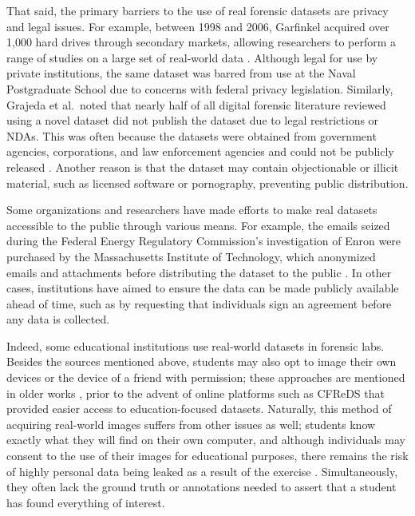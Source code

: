\documentclass[letterpaper,12pt]{report}
\begin{document}
That said, the primary barriers to the use of real forensic datasets are
privacy and legal issues. For example, between 1998 and 2006, Garfinkel
acquired over 1,000 hard drives through secondary markets, allowing
researchers to perform a range of studies on a large set of real-world
data \cite{garfinkelForensicCorporaChallenge2007}. Although legal
for use by private institutions, the same dataset was barred from use at
the Naval Postgraduate School due to concerns with federal privacy
legislation. Similarly, Grajeda et al.~noted that nearly half of all
digital forensic literature reviewed using a novel dataset did not
publish the dataset due to legal restrictions or NDAs. This was often
because the datasets were obtained from government agencies,
corporations, and law enforcement agencies and could not be publicly
released \cite{grajedaAvailabilityDatasetsDigital2017}. Another
reason is that the dataset may contain objectionable or illicit
material, such as licensed software or pornography, preventing public
distribution.

Some organizations and researchers have made efforts to make real
datasets accessible to the public through various means. For example,
the emails seized during the Federal Energy Regulatory Commission's
investigation of Enron were purchased by the Massachusetts Institute of
Technology, which anonymized emails and attachments before distributing
the dataset to the public
\cite{yannikosDataCorporaDigital2014,garfinkelForensicCorporaChallenge2007}.
In other cases, institutions have aimed to ensure the data can be made
publicly available ahead of time, such as by requesting that individuals
sign an agreement before any data is collected.

Indeed, some educational institutions use real-world datasets in
forensic labs. Besides the sources mentioned above, students may also
opt to image their own devices or the device of a friend with
permission; these approaches are mentioned in older works
\cite{andersonComparativeStudyTeaching2006,mochForensicImageGenerator2009},
prior to the advent of online platforms such as CFReDS that provided
easier access to education-focused datasets. Naturally, this method of
acquiring real-world images suffers from other issues as well; students
know exactly what they will find on their own computer, and although
individuals may consent to the use of their images for educational
purposes, there remains the risk of highly personal data being leaked as
a result of the exercise \cite{garfinkelBringingScienceDigital2009}.
Simultaneously, they often lack the ground truth or annotations needed
to assert that a student has found everything of interest.
\end{document}
